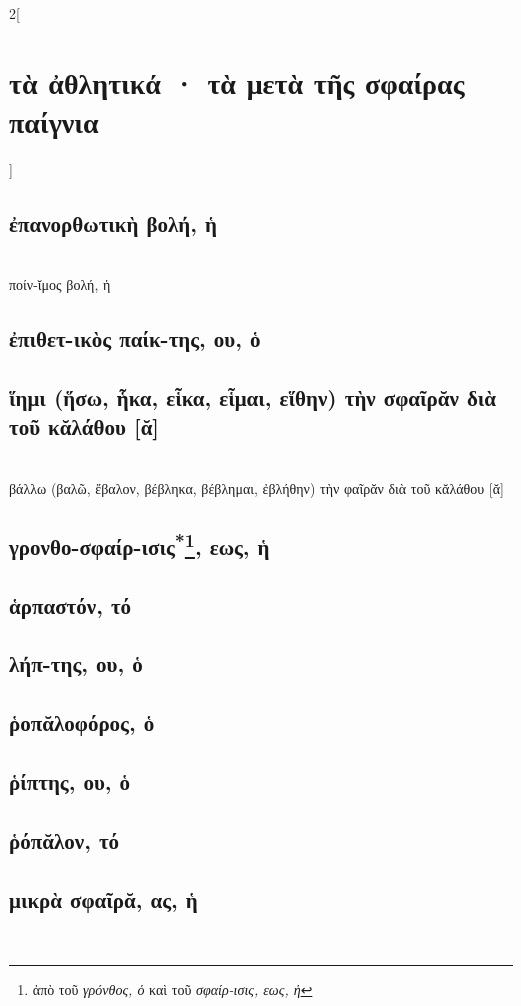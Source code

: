\documentclass{book}
\begin{document}
\newpage 
\begin{multicols}{2}[\section{τὰ ἀθλητικά · τὰ μετὰ τῆς σφαίρας παίγνια}]
\subsection{ἐπανορθωτικὴ βολή, ἡ}
 ~\\
ποίν-ῐμος βολή, ἡ
\subsection{ἐπιθετ-ικὸς παίκ-της, ου, ὁ}
\subsection{ἵημι (ἥσω, ἧκα, εἷκα, εἷμαι, εἵθην) τὴν σφαῖρᾰν διὰ τοῦ κᾰλάθου [ᾰ]}
 ~\\
βάλλω (βαλῶ, ἔβαλον, βέβληκα, βέβλημαι, ἐβλήθην) τὴν φαῖρᾰν διὰ τοῦ κᾰλάθου [ᾰ]
\subsection{γρονθο-σφαίρ-ισις\textsuperscript{*}\protect\footnote{ἀπὸ τοῦ \emph{γρόνθος, ὁ} καὶ τοῦ \emph{σφαίρ-ισις, εως, ἡ}}, εως, ἡ}
\subsection{ἁρπαστόν, τό}
\subsection{λήπ-της, ου, ὁ}
\subsection{ῥοπᾰλοφόρος, ὁ}
\subsection{ῥίπτης, ου, ὁ}
\subsection{ῥόπᾰλον, τό}
\subsection{μικρὰ σφαῖρᾰ, ας, ἡ}
~
\end{multicols}
\end{document}
